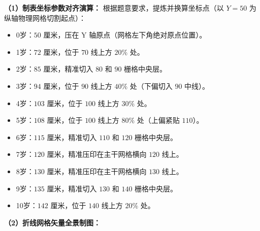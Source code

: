 \textbf{（1）制表坐标参数对齐演算：}
根据题意要求，提炼并换算坐标点（以 $Y=50$ 为纵轴物理网格切割起点）：
\begin{itemize}
    \item 0岁：$50$ 厘米，压在 Y 轴原点（网格左下角绝对原点位置）。
    \item 1岁：$72$ 厘米，位于 $70$ 线上方 $20\%$ 处。
    \item 2岁：$85$ 厘米，精准切入 $80$ 和 $90$ 栅格中央层。
    \item 3岁：$94$ 厘米，位于 $90$ 线上方 $40\%$ 处（下偏切入 $90$ 中线）。
    \item 4岁：$103$ 厘米，位于 $100$ 线上方 $30\%$ 处。
    \item 5岁：$108$ 厘米，位于 $100$ 线上方 $80\%$ 处（上偏紧贴 $110$）。
    \item 6岁：$115$ 厘米，精准切入 $110$ 和 $120$ 栅格中央层。
    \item 7岁：$120$ 厘米，精准压印在主干网格横向 $120$ 线上。
    \item 8岁：$130$ 厘米，精准压印在主干网格横向 $130$ 线上。
    \item 9岁：$135$ 厘米，精准切入 $130$ 和 $140$ 栅格中央层。
    \item 10岁：$142$ 厘米，位于 $140$ 线上方 $20\%$ 处。
\end{itemize}

\textbf{（2）折线网格矢量全景制图：}

